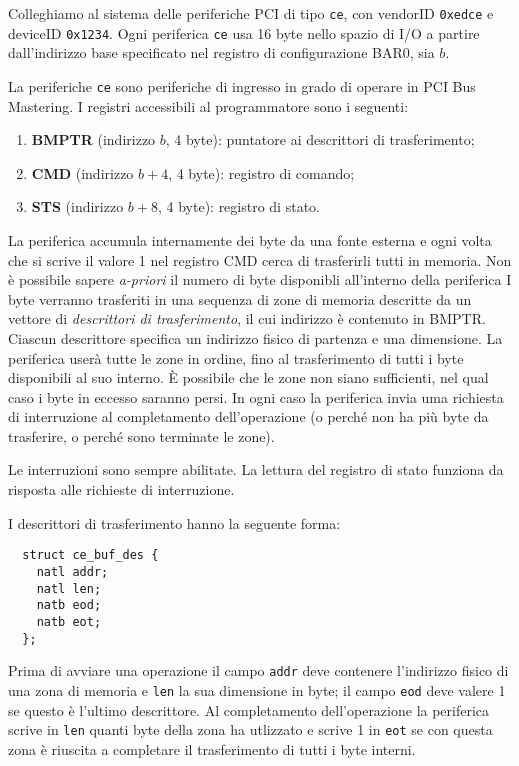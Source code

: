 Colleghiamo al sistema delle periferiche PCI di tipo \verb|ce|, con vendorID \verb|0xedce| e deviceID \verb|0x1234|.
Ogni periferica \verb|ce| usa 16 byte nello spazio di I/O a partire dall'indirizzo base specificato nel
registro di configurazione BAR0, sia $b$.

La periferiche \verb|ce| sono periferiche di ingresso in grado di operare in PCI Bus Mastering.
I registri accessibili al programmatore sono i seguenti:
\begin{enumerate}
  \item {\bf BMPTR} (indirizzo $b$, 4 byte): puntatore ai descrittori di trasferimento;
  \item {\bf CMD} (indirizzo $b+4$, 4 byte): registro di comando;
  \item {\bf STS} (indirizzo $b+8$, 4 byte): registro di stato.
\end{enumerate}
La periferica accumula internamente dei byte da una fonte esterna e
ogni volta che si scrive il valore 1 nel registro CMD cerca di trasferirli tutti
in memoria. Non \`e possibile sapere {\em a-priori} il numero di byte disponibli
all'interno della periferica
I byte verranno trasferiti in una sequenza di zone di memoria descritte
da un vettore di {\em descrittori di trasferimento}, il cui indirizzo \`e contenuto in BMPTR. Ciascun descrittore specifica un indirizzo fisico di partenza e una dimensione.
La periferica user\`a tutte le zone in ordine, fino al trasferimento
di tutti i byte disponibili al suo interno. \`E possibile che le zone
non siano sufficienti, nel qual caso i byte in eccesso saranno persi.
In ogni caso la periferica invia uma richiesta di interruzione al completamento dell'operazione
(o perch\'e non ha pi\`u byte da trasferire, o perch\'e sono terminate
le zone).

Le interruzioni sono sempre abilitate. La lettura del registro di stato funziona da risposta alle richieste di interruzione.

I descrittori di trasferimento hanno la seguente forma:
\begin{verbatim}
  struct ce_buf_des {
    natl addr;
    natl len;
    natb eod; 
    natb eot;
  };
\end{verbatim}
Prima di avviare una operazione il campo \verb|addr| 
deve contenere l'indirizzo fisico di una zona di memoria e
\verb|len| la sua dimensione in byte; il campo \verb|eod| deve
valere 1 se questo \`e l'ultimo descrittore.
Al completamento dell'operazione la periferica scrive in \verb|len|
quanti byte della zona ha utlizzato e scrive 1 in \verb|eot| se con questa
zona \`e riuscita a completare il trasferimento di tutti i byte interni.

